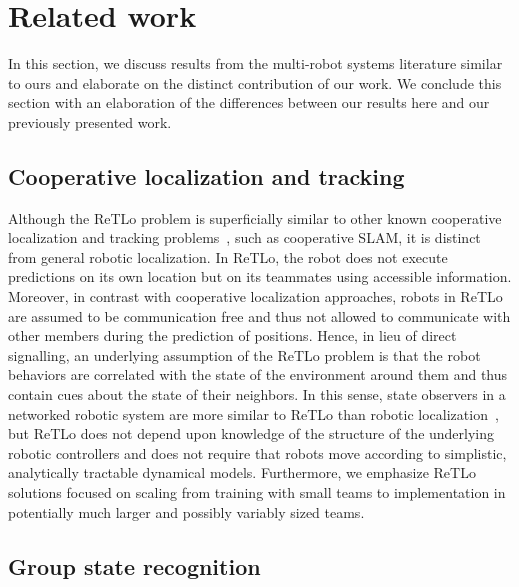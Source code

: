 \documentclass[letterpaper, 10 pt, conference]{ieeeconf}  %
\begin{document}
	\section{Related work}
	\label{sec:related_work}

    In this section, we discuss results from the multi-robot
    systems literature similar to ours and elaborate on the distinct
    contribution of our work. We conclude this section with an
    elaboration of the differences between our results here and our
    previously presented work.

    \subsection{Cooperative localization and tracking}

    Although the ReTLo problem is superficially similar to other known
    cooperative localization and tracking problems~\cite{GKD04, LSRB16,
    FSDO10, CX14, DMG15}, such as cooperative SLAM, it is distinct
    from general robotic localization. In ReTLo, the robot does not
    execute predictions on its own location but on its teammates using
    accessible information. Moreover, in contrast with cooperative
    localization approaches, robots in ReTLo are assumed to be
    communication free and thus not allowed to communicate with other
    members during the prediction of positions. Hence, in lieu of direct
    signalling, an underlying assumption of the ReTLo problem is that the
    robot behaviors are correlated with the state of the environment
    around them and thus contain cues about the state of their
    neighbors. In this sense, state observers in a networked robotic
    system are more similar to ReTLo than robotic
    localization~\cite{XNX10, GACM12}, but ReTLo does not depend upon
    knowledge of the structure of the underlying robotic controllers and
    does not require that robots move according to simplistic,
    analytically tractable dynamical models. Furthermore, we emphasize
    ReTLo solutions focused on scaling from training with small teams to
    implementation in potentially much larger and possibly variably
    sized teams.

	\subsection{Group state recognition}
	\label{sec:group_state_recognition}
\end{document}
